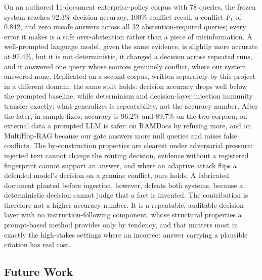 \documentclass[conference]{IEEEtran}
\begin{document}
On an authored 11-document enterprise-policy corpus with 78 queries, the
frozen system reaches 92.3\% decision accuracy, 100\% conflict recall, a conflict
$F_1$ of 0.842, and zero unsafe answers across all 32 abstention-required
queries; every error it makes is a safe over-abstention rather than a piece
of misinformation. A well-prompted language model, given the same evidence,
is slightly more accurate at 97.4\%, but it is not deterministic, it changed
a decision across repeated runs, and it answered one query whose sources
genuinely conflict, where our system answered none. Replicated on a second
corpus, written separately by this project in a different domain, the same
split holds:
decision accuracy drops well below the prompted baseline, while
determinism and decision-layer injection immunity transfer exactly:
what generalizes is repeatability, not the accuracy number. After the
later, in-sample fixes, accuracy is 96.2\% and 89.7\% on the two corpora;
on external data a prompted LLM is safer: on RAMDocs by refusing more, and
on MultiHop-RAG because our gate answers more null queries and raises false
conflicts. The
by-construction properties are clearest under adversarial pressure: injected
text cannot change the routing decision, evidence without a registered
fingerprint cannot support an answer, and where an adaptive attack flips a
defended model's decision on a genuine conflict, ours holds. A fabricated
document planted before ingestion, however, defeats both systems, because a
deterministic decision cannot judge that a fact is invented. The
contribution is therefore not a higher accuracy number. It is a repeatable,
auditable decision layer with no instruction-following component, whose
structural properties a prompt-based method provides only by tendency, and
that matters most in exactly the high-stakes settings where an incorrect
answer carrying a plausible citation has real cost.

\subsection{Future Work}
\label{sec:future}
\end{document}
